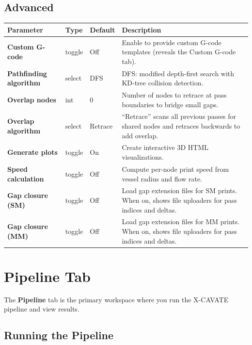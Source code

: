 \documentclass[11pt,letterpaper]{article}
\newcommand{\gui}[1]{\textcolor{guicolor}{\textsf{\textbf{#1}}}}
\begin{document}
\subsection{Advanced}

\begin{tabularx}{\textwidth}{L{3.5cm} l l X}
\toprule
\textbf{Parameter} & \textbf{Type} & \textbf{Default} & \textbf{Description} \\
\midrule
\gui{Custom G-code} & toggle & Off & Enable to provide custom G-code templates (reveals the Custom G-code tab). \\
\gui{Pathfinding algorithm} & select & DFS & DFS: modified depth-first search with KD-tree collision detection. \\
\gui{Overlap nodes} & int & 0 & Number of nodes to retrace at pass boundaries to bridge small gaps. \\
\gui{Overlap algorithm} & select & Retrace & ``Retrace'' scans all previous passes for shared nodes and retraces backwards to add overlap. \\
\gui{Generate plots} & toggle & On & Create interactive 3D HTML visualizations. \\
\gui{Speed calculation} & toggle & Off & Compute per-node print speed from vessel radius and flow rate. \\
\gui{Gap closure (SM)} & toggle & Off & Load gap extension files for SM prints. When on, shows file uploaders for pass indices and deltas. \\
\gui{Gap closure (MM)} & toggle & Off & Load gap extension files for MM prints. When on, shows file uploaders for pass indices and deltas. \\
\bottomrule
\end{tabularx}

\section{Pipeline Tab}
\label{sec:pipeline}

The \gui{Pipeline} tab is the primary workspace where you run the X-CAVATE
pipeline and view results.

\subsection{Running the Pipeline}
\end{document}
